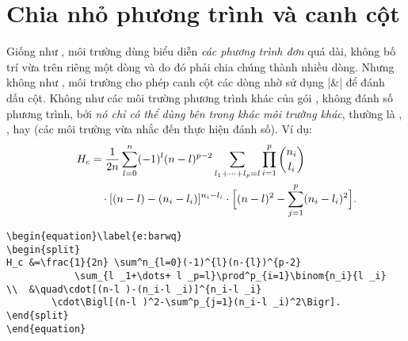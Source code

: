 \documentclass[11pt,leqno,titlepage,openany,oneside]{amsldoc}[1999/12/13]
\begin{document}
\section{Chia nhỏ phương trình và canh cột}

Giống như , môi trường  dùng biểu diễn
\emph{các phương trình đơn} quá dài, không bố trí vừa trên riêng một dòng
và do đó phải chia chúng thành nhiều dòng.
Nhưng không như , môi trường 
cho phép canh cột các dòng nhờ sử dụng |&| để đánh dấu cột.
Không như các môi trường phương trình khác của gói ,
 không đánh số phương trình, bởi \emph{nó chỉ có thể dùng
bên trong khác môi trường khác}, thường là
, , hay 
(các môi trường vừa nhắc đến thực hiện đánh số). Ví dụ:
\begin{equation}\label{e:barwq}\begin{split}
H_c&=\frac{1}{2n} \sum^n_{l=0}(-1)^{l}(n-{l})^{p-2}
\sum_{l _1+\dots+ l _p=l}\prod^p_{i=1} \binom{n_i}{l _i}\\
&\quad\cdot[(n-l )-(n_i-l _i)]^{n_i-l _i}\cdot
\Bigl[(n-l )^2-\sum^p_{j=1}(n_i-l _i)^2\Bigr].
\kern-2em %
\end{split}\end{equation}

\begin{verbatim}
\begin{equation}\label{e:barwq}
\begin{split}
H_c &=\frac{1}{2n} \sum^n_{l=0}(-1)^{l}(n-{l})^{p-2}
            \sum_{l _1+\dots+ l _p=l}\prod^p_{i=1}\binom{n_i}{l _i}
\\  &\quad\cdot[(n-l )-(n_i-l _i)]^{n_i-l _i}
        \cdot\Bigl[(n-l )^2-\sum^p_{j=1}(n_i-l _i)^2\Bigr].
\end{split}
\end{equation}
\end{verbatim}
\end{document}
